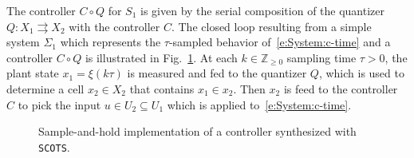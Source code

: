\documentclass[a4paper]{amsart}
\newcommand{\segcc}[1]{\ensuremath{{\left\llbracket#1\right\rrbracket}}}
\newcommand{\Z}{\mathbb{Z}}
\begin{document}
The controller $C\circ Q$ for $S_1$ is given by the serial composition of the quantizer
$Q:X_1\rightrightarrows X_2$ with the controller $C$. 
The closed loop resulting from a simple system $\Sigma_1$ which represents the $\tau$-sampled
behavior of~\eqref{e:System:c-time} and a controller $C\circ Q$ is illustrated
in Fig.~\ref{f:closedloop}. At each $k\in\Z_{\ge0}$ sampling
time $\tau>0$, the plant state $x_1=\xi(k\tau)$ is measured and fed to the
quantizer $Q$, which is used to determine a cell $x_2\in X_2$ that contains
$x_1\in x_2$. Then $x_2$ is feed to the controller $C$ to pick the input $u\in
U_2\subseteq U_1$ which is applied to~\eqref{e:System:c-time}.
\begin{figure}[h]
  \centering
\caption{Sample-and-hold implementation of a controller synthesized with {\tt SCOTS}.}\label{f:closedloop}
\end{figure}

%
\end{document}
